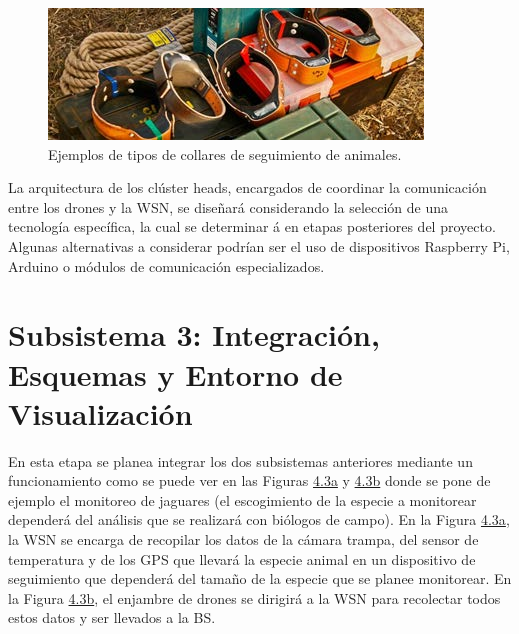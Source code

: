 \begin{figure}[h]
    \centering
    \includegraphics[width=0.8\linewidth]{imagenes/img3_ejemplos_collares.jpg}
    \caption{Ejemplos de tipos de collares de seguimiento de animales.}
    \label{fig:enter-label}
\end{figure}

\noindent La arquitectura de los clúster heads, encargados de coordinar la comunicación entre los drones y la WSN, se diseñará considerando la selección de una tecnología específica, la cual se determinar á en etapas posteriores del proyecto. Algunas alternativas a considerar podrían ser el uso de dispositivos Raspberry Pi, Arduino o módulos de comunicación especializados.

\section{Subsistema 3: Integración, Esquemas y Entorno de Visualización}
En esta etapa se planea integrar los dos subsistemas anteriores mediante un funcionamiento como se puede ver en las Figuras \hyperref[figura4]{4.3a} y \hyperref[figura4]{4.3b} donde se pone de ejemplo el monitoreo de jaguares (el escogimiento de la especie a monitorear dependerá del análisis que se realizará con biólogos de campo). En la Figura \hyperref[figura4]{4.3a}, la WSN se encarga de recopilar los datos de la cámara trampa, del sensor de temperatura y de los GPS que llevará la especie animal en un dispositivo de seguimiento que dependerá del tamaño de la especie que se planee monitorear. En la Figura \hyperref[figura4]{4.3b}, el enjambre de drones se dirigirá a la WSN para recolectar todos estos datos y ser llevados a la BS.


